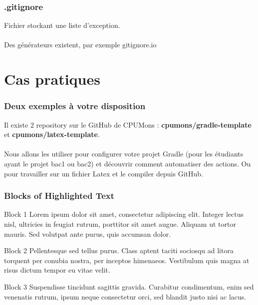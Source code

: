 \documentclass{beamer}
\begin{document}

\begin{frame}\frametitle{.gitignore}
    Fichier stockant une liste d'exception. \\~\\

    Des générateurs existent, par exemple gitignore.io
\end{frame}

\section{Cas pratiques} %

\begin{frame}\frametitle{Deux exemples à votre disposition}
    Il existe 2 repository sur le GitHub de CPUMons : \textbf{cpumons/gradle-template} et \textbf{cpumons/latex-template}. \\~\\

    Nous allons les utiliser pour configurer votre projet Gradle (pour les étudiants ayant le projet bac1 ou bac2) et découvrir comment automatiser des actions. Ou pour travailler sur un fichier Latex et le compiler depuis GitHub.
\end{frame}


\begin{frame}
\frametitle{Blocks of Highlighted Text}
\begin{block}{Block 1}
Lorem ipsum dolor sit amet, consectetur adipiscing elit. Integer lectus nisl, ultricies in feugiat rutrum, porttitor sit amet augue. Aliquam ut tortor mauris. Sed volutpat ante purus, quis accumsan dolor.
\end{block}

\begin{block}{Block 2}
Pellentesque sed tellus purus. Class aptent taciti sociosqu ad litora torquent per conubia nostra, per inceptos himenaeos. Vestibulum quis magna at risus dictum tempor eu vitae velit.
\end{block}

\begin{block}{Block 3}
Suspendisse tincidunt sagittis gravida. Curabitur condimentum, enim sed venenatis rutrum, ipsum neque consectetur orci, sed blandit justo nisi ac lacus.
\end{block}
\end{frame}
\end{document}
